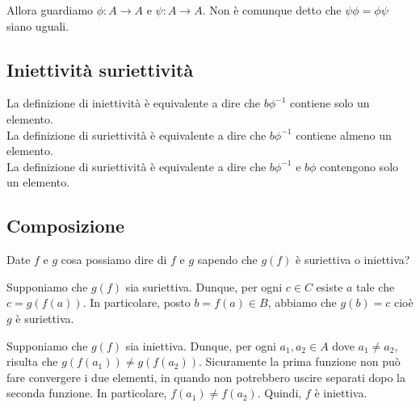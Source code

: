 \documentclass[a4paper]{article}
\begin{document}
Allora guardiamo \(\phi \colon A\to A\) e \(\psi \colon A\to A\).
Non è comunque detto che \(\psi\phi = \phi\psi\) siano uguali.



\subsection{Iniettività suriettività}

La definizione di iniettività è equivalente a dire che \(b\phi^{-1}\) contiene solo un elemento. \\
La definizione di suriettività è equivalente a dire che \(b\phi^{-1}\) contiene almeno un elemento. \\
La definizione di suriettività è equivalente a dire che \(b\phi^{-1}\) e \(b\phi\) contengono solo un elemento.

\subsection{Composizione}

Date \(f\) e \(g\) cosa possiamo dire di \(f\) e \(g\) sapendo che \(g(f)\) è suriettiva o iniettiva?

Supponiamo che \(g(f)\) sia suriettiva.
Dunque, per ogni \(c\in C\) esiste \(a\) tale che \(c=g(f(a))\).
In particolare, posto \(b=f(a) \in B\), abbiamo che \(g(b)=c\) cioè \(g\) è suriettiva.

Supponiamo che \(g(f)\) sia iniettiva.
Dunque, per ogni \(a_1, a_2 \in A\) dove \(a_1 \neq a_2\), risulta che \(g(f(a_1)) \neq g(f(a_2))\).
Sicuramente la prima funzione non può fare convergere i due elementi, in quando non potrebbero uscire separati
dopo la seconda funzione.
In particolare, \(f(a_1) \neq f(a_2)\). Quindi, \(f\) è iniettiva.

\end{document}
